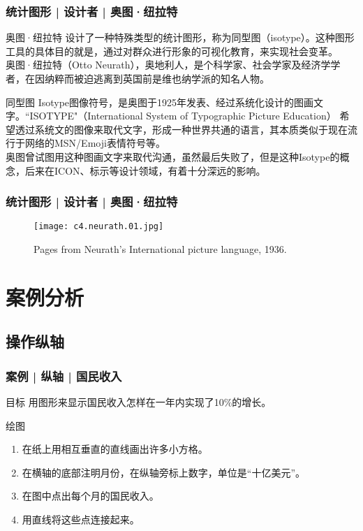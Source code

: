 \begin{frame}
  \frametitle{统计图形 | 设计者 | 奥图·纽拉特}
  \begin{block}{奥图·纽拉特}
    设计了一种特殊类型的统计图形，称为同型图（isotype）。这种图形工具的具体目的就是，通过对群众进行形象的可视化教育，来实现社会变革。\\
    \vspace{0.5em}
奥图·纽拉特（Otto Neurath），奥地利人，是个科学家、社会学家及经济学学者，在因纳粹而被迫逃离到英国前是维也纳学派的知名人物。    
  \end{block}
  \pause
  \begin{block}{同型图}
    Isotype图像符号，是奥图于1925年发表、经过系统化设计的图画文字。``ISOTYPE"（International System of Typographic Picture Education） 希望透过系统文的图像来取代文字，形成一种世界共通的语言，其本质类似于现在流行于网络的MSN/Emoji表情符号等。\\
    \vspace{0.5em}
    奥图曾试图用这种图画文字来取代沟通，虽然最后失败了，但是这种Isotype的概念，后来在ICON、标示等设计领域，有着十分深远的影响。
  \end{block}
\end{frame}

\begin{frame}
  \frametitle{统计图形 | 设计者 | 奥图·纽拉特}
  \begin{figure}
    \centering
    \texttt{[image: c4.neurath.01.jpg]}
    \caption{Pages from Neurath's International picture language, 1936.}
  \end{figure}
\end{frame}

\section{案例分析}
\subsection{操作纵轴}
\begin{frame}
  \frametitle{案例 | 纵轴 | 国民收入}
  \begin{block}{目标}
    用图形来显示国民收入怎样在一年内实现了10\%的增长。
  \end{block}
  \pause
  \begin{block}{绘图}
    \begin{enumerate}
      \item 在纸上用相互垂直的直线画出许多小方格。
      \item 在横轴的底部注明月份，在纵轴旁标上数字，单位是“十亿美元”。
      \item 在图中点出每个月的国民收入。
      \item 用直线将这些点连接起来。
    \end{enumerate}
  \end{block}
\end{frame}

